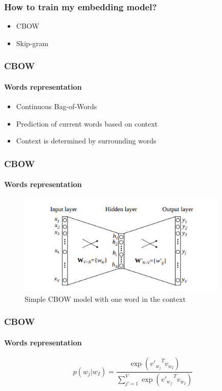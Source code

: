 
\begin{frame}
\frametitle{How to train my embedding model?}
	
	\begin{itemize}
		\item CBOW
		\item Skip-gram
	\end{itemize}

\end{frame}

\begin{frame}
\frametitle{CBOW}
	\framesubtitle{Words representation}

	\begin{itemize}
		\item Continuous Bag-of-Words
		\item Prediction of current words based on context
		\item Context is determined by surrounding words
	\end{itemize}

\end{frame}

\begin{frame}
\frametitle{CBOW}
	\framesubtitle{Words representation}
%
	\begin{figure}
		\includegraphics[width=10cm]{./figures/cbow_simple}
		\caption{Simple CBOW model with one word in the context}
	\end{figure}

\end{frame}


\begin{frame}
\frametitle{CBOW}
	\framesubtitle{Words representation}


$$p(w_j|w_I)= \frac{\exp({v'_{w_j}}^{T}v_{w_I})}{ \sum_{j'=1}^{V} \exp({v'_{w_{j'}}}^{T}v_{w_I})}$$

\end{frame}


